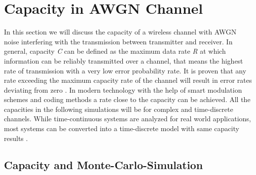 \chapter{Capacity in AWGN Channel} \label{chap:awgnchan}
\graphicspath{{C:/Users/Kevin/Bachelarbeit/Bachelorarbeit/01_Bachelorarbeit_LaTex/02_Figures/}}

In this section we will discuss the capacity of a wireless channel with \gls{AWGN} noise interfering with the transmission between transmitter and receiver. 
\newline
In general, capacity \textit{C} can be defined as the maximum data rate \textit{R} at which information can be reliably transmitted over a channel, that means the highest rate of transmission with a very low error probability rate. It is proven that any rate exceeding the maximum capacity rate of the channel will result in error rates deviating from zero \cite{Shannon}. In modern technology with the help of smart modulation schemes and coding methods a rate close to the capacity can be achieved.
All the capacities in the following simulations will be for complex and time-discrete channels. 
While time-continuous systems are analyzed for real world applications, most systems can be converted into a time-discrete model with same capacity results \cite{Goldsmith08}. 
\section{Capacity and Monte-Carlo-Simulation}
\label{sec:capAWGN}

